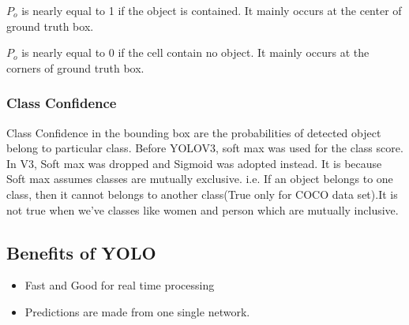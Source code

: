                        \tab $P_o$ is nearly equal to 1 if the object is contained. It mainly occurs at the center of ground truth box.
                        
                        \tab $P_o$ is nearly equal to 0 if the cell contain no object. It mainly occurs at the corners of ground truth box.
                            
                \subsubsection{Class Confidence}
                    Class Confidence in the bounding box are the probabilities of detected object belong to particular class. Before YOLOV3, soft max was used for the class score. In V3, Soft max was dropped and Sigmoid was adopted instead. It is because Soft max assumes classes are mutually exclusive. i.e. If an object belongs to one class, then it cannot belongs to another class(True only for COCO data set).It is not true when we've classes like women and person which are mutually inclusive.
            \subsection{Benefits of YOLO}
                \begin{itemize}
                    \item Fast and Good for real time processing
	                \item Predictions are made from one single network.
                \end{itemize}
                
